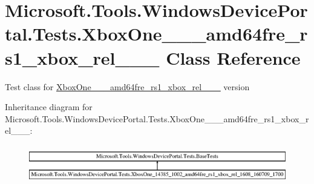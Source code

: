 \hypertarget{class_microsoft_1_1_tools_1_1_windows_device_portal_1_1_tests_1_1_xbox_one__14385__1002__amd64frd9599e6105747a2dd5ce5cbe798a705b}{}\section{Microsoft.\+Tools.\+Windows\+Device\+Portal.\+Tests.\+Xbox\+One\+\_\+\_\+\_\+amd64fre\+\_\+rs1\+\_\+xbox\+\_\+rel\+\_\+\_\+\_ Class Reference}
\label{class_microsoft_1_1_tools_1_1_windows_device_portal_1_1_tests_1_1_xbox_one__14385__1002__amd64frd9599e6105747a2dd5ce5cbe798a705b}


Test class for \hyperlink{class_microsoft_1_1_tools_1_1_windows_device_portal_1_1_tests_1_1_xbox_one__14385__1002__amd64frd9599e6105747a2dd5ce5cbe798a705b}{Xbox\+One\+\_\+\_\+\_\+amd64fre\+\_\+rs1\+\_\+xbox\+\_\+rel\+\_\+\_\+\_} version  


Inheritance diagram for Microsoft.\+Tools.\+Windows\+Device\+Portal.\+Tests.\+Xbox\+One\+\_\+\_\+\_\+amd64fre\+\_\+rs1\+\_\+xbox\+\_\+rel\+\_\+\_\+\_\+:\begin{figure}[H]
\begin{center}
\leavevmode
\includegraphics[height=1.696970cm]{class_microsoft_1_1_tools_1_1_windows_device_portal_1_1_tests_1_1_xbox_one__14385__1002__amd64frd9599e6105747a2dd5ce5cbe798a705b}
\end{center}
\end{figure}
